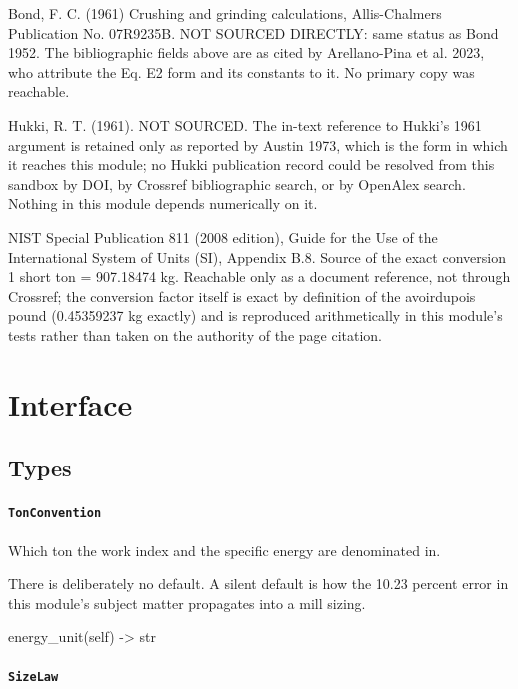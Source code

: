 \documentclass[10pt,a4paper,twoside]{report}
\begin{document}
Bond, F. C. (1961) Crushing and grinding calculations, Allis-Chalmers Publication No. 07R9235B. NOT SOURCED DIRECTLY: same status as Bond 1952. The bibliographic fields above are as cited by Arellano-Pina et al. 2023, who attribute the Eq. E2 form and its constants to it. No primary copy was reachable.

Hukki, R. T. (1961). NOT SOURCED. The in-text reference to Hukki's 1961 argument is retained only as reported by Austin 1973, which is the form in which it reaches this module; no Hukki publication record could be resolved from this sandbox by DOI, by Crossref bibliographic search, or by OpenAlex search. Nothing in this module depends numerically on it.

NIST Special Publication 811 (2008 edition), Guide for the Use of the International System of Units (SI), Appendix B.8. Source of the exact conversion 1 short ton = 907.18474 kg. Reachable only as a document reference, not through Crossref; the conversion factor itself is exact by definition of the avoirdupois pound (0.45359237 kg exactly) and is reproduced arithmetically in this module's tests rather than taken on the authority of the page citation.

\section{Interface}

\subsection*{Types}

\paragraph{\texttt{TonConvention}}

Which ton the work index and the specific energy are denominated in.

There is deliberately no default. A silent default is how the 10.23 percent error in this module's subject matter propagates into a mill sizing.

\begin{verbatimsmall}
energy_unit(self) -> str
\end{verbatimsmall}

\paragraph{\texttt{SizeLaw}}
\end{document}
